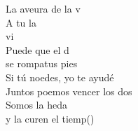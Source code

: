\begin{cancion}
\begin{chorus}
		La aveura de la v \\
		A tu la \\
		vi  \\
		Puede que el d \\
		se rompatus pies  \\
		Si tú noedes, yo te ayudé \\
		Juntos poemos vencer los dos\\
		Somos la heda \\
		y la curen el tiemp()\jump\\
	\end{chorus}%
\end{cancion}%
